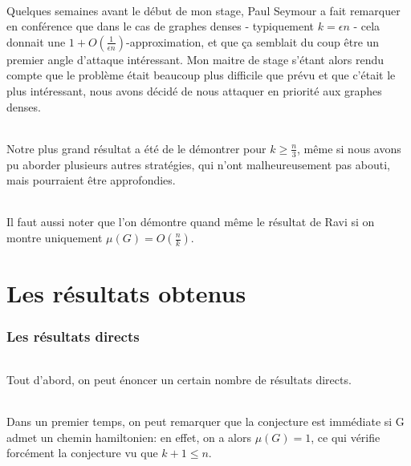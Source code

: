 \documentclass[a4paper]{article}
\theoremstyle{definition}
\theoremstyle{remark}
\begin{document}
\paragraph{}
Quelques semaines avant le début de mon stage, Paul Seymour a fait
remarquer en conférence que dans le cas de graphes denses - typiquement 
$k = \epsilon n$ - cela donnait une $1 + O(\frac{1}{\epsilon n})$-approximation, et que ça semblait du coup être un premier angle d'attaque 
intéressant. Mon maitre de stage s'étant alors rendu compte que le 
problème était beaucoup plus difficile que prévu et que c'était le plus 
intéressant, nous avons décidé de nous attaquer en priorité aux
graphes denses.

\paragraph{}
Notre plus grand résultat a été de le démontrer pour $k \geq \frac{n}{3}$, même si nous avons pu aborder plusieurs autres stratégies, qui n'ont malheureusement pas 
abouti, mais pourraient être approfondies.


\paragraph{}
Il faut aussi noter que l'on démontre quand même le résultat de Ravi si on montre uniquement $\mu(G)=O(\frac{n}{k})$.

\part{Les résultats obtenus}

\section{Les résultats directs}

\paragraph{}
Tout d'abord, on peut énoncer un certain nombre de résultats directs.


\paragraph{}
Dans un premier temps, on peut remarquer que la conjecture est immédiate si G admet un chemin hamiltonien: en effet, on a alors $\mu(G)=1$, ce qui vérifie forcément la conjecture vu que $k+1 \leq n$.
\end{document}

